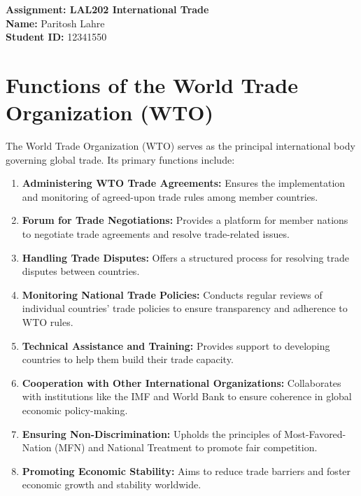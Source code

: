 \documentclass[12pt]{article}
\begin{document}
	
	\begin{center}
		\LARGE\textbf{Assignment: LAL202 International Trade} \\
		\vspace{0.2cm}
		\large\textbf{Name:} Paritosh Lahre \\
		\textbf{Student ID:} 12341550 \\
	\end{center}
	
	\vspace{1cm}
	
	\section{Functions of the World Trade Organization (WTO)}
	
	The World Trade Organization (WTO) serves as the principal international body governing global trade. Its primary functions include:
	
	\begin{enumerate}[label=\arabic*.]
		\item \textbf{Administering WTO Trade Agreements:} Ensures the implementation and monitoring of agreed-upon trade rules among member countries.
		\item \textbf{Forum for Trade Negotiations:} Provides a platform for member nations to negotiate trade agreements and resolve trade-related issues.
		\item \textbf{Handling Trade Disputes:} Offers a structured process for resolving trade disputes between countries.
		\item \textbf{Monitoring National Trade Policies:} Conducts regular reviews of individual countries' trade policies to ensure transparency and adherence to WTO rules.
		\item \textbf{Technical Assistance and Training:} Provides support to developing countries to help them build their trade capacity.
		\item \textbf{Cooperation with Other International Organizations:} Collaborates with institutions like the IMF and World Bank to ensure coherence in global economic policy-making.
		\item \textbf{Ensuring Non-Discrimination:} Upholds the principles of Most-Favored-Nation (MFN) and National Treatment to promote fair competition.
		\item \textbf{Promoting Economic Stability:} Aims to reduce trade barriers and foster economic growth and stability worldwide.
	\end{enumerate}
	
\end{document}

